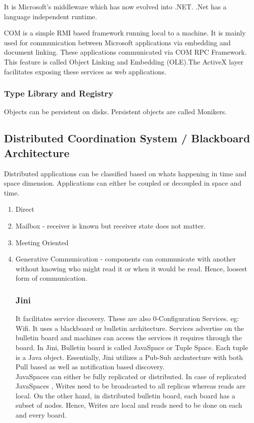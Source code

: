 \documentclass[a4paper]{article}
\begin{document}
It is Microsoft's middleware which has now evolved into .NET. .Net has a language independent runtime.

COM is a simple RMI based framework running local to a machine. It is mainly used for communication between Microsoft applications via embedding and document linking. These applications communicated via COM RPC Framework. This feature is called Object Linking and Embedding (OLE).The ActiveX layer facilitates exposing these services as web applications.\\

\subsubsection{Type Library and Registry}
Objects can be persistent on disks. Persistent objects are called Monikers. 

\subsection{Distributed Coordination System / Blackboard Architecture}

Distributed applications can be classified based on whats happening in time and space dimension. Applications can either be coupled or decoupled in space and time.\\

\begin{enumerate}
\item Direct  
\item Mailbox - receiver is known but receiver state does not matter.
\item Meeting Oriented  
\item Generative Communication -  components can communicate with another without knowing who might read it or when it would be read. Hence, loosest form of communication.

\subsubsection{Jini}

It facilitates service discovery. These are also 0-Configuration Services. eg: Wifi. It uses a blackboard or bulletin architecture. Services advertise on the bulletin board and machines can access the services it requires through the board.
In Jini, Bulletin board is called JavaSpace or Tuple Space. Each tuple is a Java object. Essentially, Jini utilizes a Pub-Sub archutecture with both Pull based as well as notification based discovery.\\

JavaSpaces can either be fully replicated or distributed. In case of replicated JavaSpaces , Writes need to be broadcasted to all replicas whereas reads are local. On the other hand, in distributed bulletin board, each  board has a subset of nodes. Hence, Writes are local and reads need to be done on each and every board.


\end{enumerate}
\end{document}
